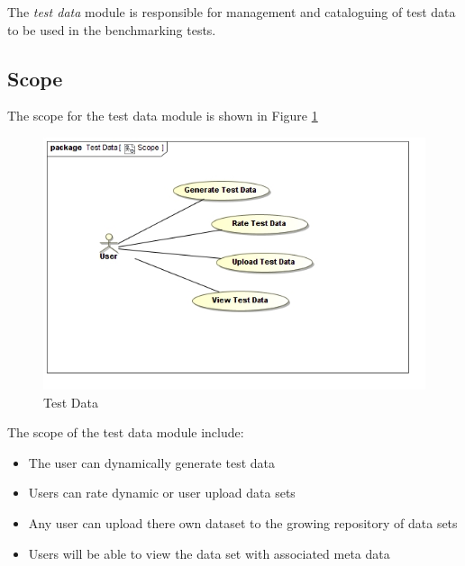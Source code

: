 The \textit{test data} module is responsible for management and cataloguing of
test data to be used in the benchmarking tests.

\subsection{Scope}
The scope for the test data module is shown in Figure \ref{fig:testData}
\begin{figure}[H]
  \begin{center}
  \includegraphics[scale=0.5]{../Diagrams and Charts/Test Data/Scope.jpg}
  \caption{Test Data}
  \end{center}
  \label{fig:testData}
\end{figure}
The scope of the test data module include:
\begin{itemize}
	\item The user can dynamically generate test data
	\item Users can rate dynamic or user upload data sets
	\item Any user can upload there own dataset to the growing repository of data sets 
	\item Users will be able to view the data set with associated meta data
\end{itemize}

